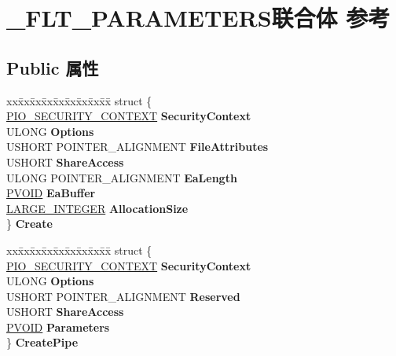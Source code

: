 \hypertarget{union___f_l_t___p_a_r_a_m_e_t_e_r_s}{}\section{\+\_\+\+F\+L\+T\+\_\+\+P\+A\+R\+A\+M\+E\+T\+E\+R\+S联合体 参考}
\label{union___f_l_t___p_a_r_a_m_e_t_e_r_s}
\subsection*{Public 属性}
\begin{DoxyCompactItemize}
\item 
\mbox{\label{union___f_l_t___p_a_r_a_m_e_t_e_r_s_adc3e469ebb3e556c71eb74ceb2795ab5}} 
\begin{tabbing}
xx\=xx\=xx\=xx\=xx\=xx\=xx\=xx\=xx\=\kill
struct \{\\
\>\hyperlink{struct___i_o___s_e_c_u_r_i_t_y___c_o_n_t_e_x_t}{PIO\_SECURITY\_CONTEXT} {\bfseries SecurityContext}\\
\>ULONG {\bfseries Options}\\
\>USHORT POINTER\_ALIGNMENT {\bfseries FileAttributes}\\
\>USHORT {\bfseries ShareAccess}\\
\>ULONG POINTER\_ALIGNMENT {\bfseries EaLength}\\
\>\hyperlink{interfacevoid}{PVOID} {\bfseries EaBuffer}\\
\>\hyperlink{union___l_a_r_g_e___i_n_t_e_g_e_r}{LARGE\_INTEGER} {\bfseries AllocationSize}\\
\} {\bfseries Create}\\

\end{tabbing}\item 
\mbox{\label{union___f_l_t___p_a_r_a_m_e_t_e_r_s_a70ef673a10e691746f1d871d92b6910c}} 
\begin{tabbing}
xx\=xx\=xx\=xx\=xx\=xx\=xx\=xx\=xx\=\kill
struct \{\\
\>\hyperlink{struct___i_o___s_e_c_u_r_i_t_y___c_o_n_t_e_x_t}{PIO\_SECURITY\_CONTEXT} {\bfseries SecurityContext}\\
\>ULONG {\bfseries Options}\\
\>USHORT POINTER\_ALIGNMENT {\bfseries Reserved}\\
\>USHORT {\bfseries ShareAccess}\\
\>\hyperlink{interfacevoid}{PVOID} {\bfseries Parameters}\\
\} {\bfseries CreatePipe}\\


\end{tabbing}
\end{DoxyCompactItemize}
